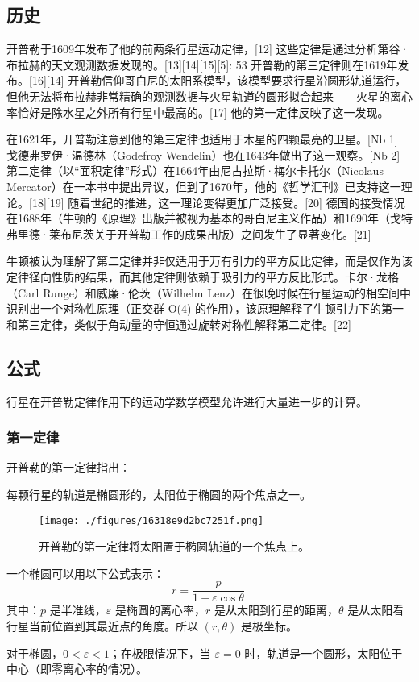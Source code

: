 \subsection{历史}  
开普勒于1609年发布了他的前两条行星运动定律，[12] 这些定律是通过分析第谷·布拉赫的天文观测数据发现的。[13][14][15][5]: 53 开普勒的第三定律则在1619年发布。[16][14] 开普勒信仰哥白尼的太阳系模型，该模型要求行星沿圆形轨道运行，但他无法将布拉赫非常精确的观测数据与火星轨道的圆形拟合起来——火星的离心率恰好是除水星之外所有行星中最高的。[17] 他的第一定律反映了这一发现。

在1621年，开普勒注意到他的第三定律也适用于木星的四颗最亮的卫星。[Nb 1] 戈德弗罗伊·温德林（Godefroy Wendelin）也在1643年做出了这一观察。[Nb 2] 第二定律（以“面积定律”形式）在1664年由尼古拉斯·梅尔卡托尔（Nicolaus Mercator）在一本书中提出异议，但到了1670年，他的《哲学汇刊》已支持这一理论。[18][19] 随着世纪的推进，这一理论变得更加广泛接受。[20] 德国的接受情况在1688年（牛顿的《原理》出版并被视为基本的哥白尼主义作品）和1690年（戈特弗里德·莱布尼茨关于开普勒工作的成果出版）之间发生了显著变化。[21]

牛顿被认为理解了第二定律并非仅适用于万有引力的平方反比定律，而是仅作为该定律径向性质的结果，而其他定律则依赖于吸引力的平方反比形式。卡尔·龙格（Carl Runge）和威廉·伦茨（Wilhelm Lenz）在很晚时候在行星运动的相空间中识别出一个对称性原理（正交群 O(4) 的作用），该原理解释了牛顿引力下的第一和第三定律，类似于角动量的守恒通过旋转对称性解释第二定律。[22]
\subsection{公式} 
行星在开普勒定律作用下的运动学数学模型允许进行大量进一步的计算。  
\subsubsection{第一定律}  
开普勒的第一定律指出：

每颗行星的轨道是椭圆形的，太阳位于椭圆的两个焦点之一。  
\begin{figure}[ht]
\centering
\texttt{[image: ./figures/16318e9d2bc7251f.png]}
\caption{开普勒的第一定律将太阳置于椭圆轨道的一个焦点上。} \label{fig_KPL_2}
\end{figure}
一个椭圆可以用以下公式表示：
\[
r = \frac{p}{1 + \varepsilon \cos \theta}~
\]
其中：\( p \) 是半准线，\( \varepsilon \) 是椭圆的离心率，\( r \) 是从太阳到行星的距离，\( \theta \) 是从太阳看行星当前位置到其最近点的角度。所以 \( (r, \theta) \) 是极坐标。

对于椭圆，\( 0 < \varepsilon < 1 \)；在极限情况下，当 \( \varepsilon = 0 \) 时，轨道是一个圆形，太阳位于中心（即零离心率的情况）。


